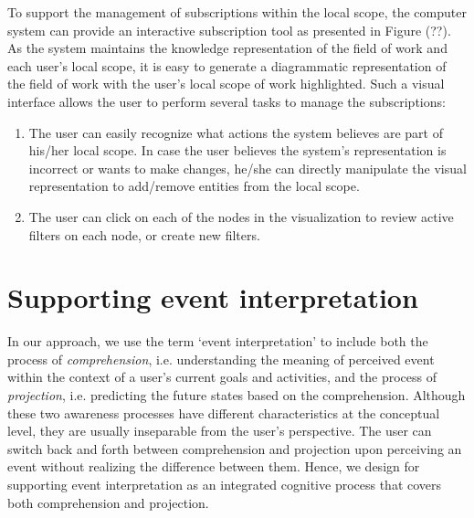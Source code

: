 To support the management of subscriptions within the local scope, the computer system can provide an interactive subscription tool as presented in Figure (??). As the system maintains the knowledge representation of the field of work and each user's local scope, it is easy to generate a diagrammatic representation of the field of work with the user's local scope of work highlighted. Such a visual interface allows the user to perform several tasks to manage the subscriptions:

\begin{enumerate}
	\item The user can easily recognize what actions the system believes are part of his/her local scope. In case the user believes the system's representation is incorrect or wants to make changes, he/she can directly manipulate the visual representation to add/remove entities from the local scope.
	\item The user can click on each of the nodes in the visualization to review active filters on each node, or create new filters. 
\end{enumerate}




\section{Supporting event interpretation} %
\label{sec:supporting_event_interpretation}
In our approach, we use the term `event interpretation' to include both the process of \emph{comprehension}, i.e. understanding the meaning of perceived event within the context of a user's current goals and activities, and the process of \emph{projection}, i.e. predicting the future states based on the comprehension. Although these two awareness processes have different characteristics at the conceptual level, they are usually inseparable from the user's perspective. The user can switch back and forth between comprehension and projection upon perceiving an event without realizing the difference between them. Hence, we design for supporting event interpretation as an integrated cognitive process that covers both comprehension and projection.

